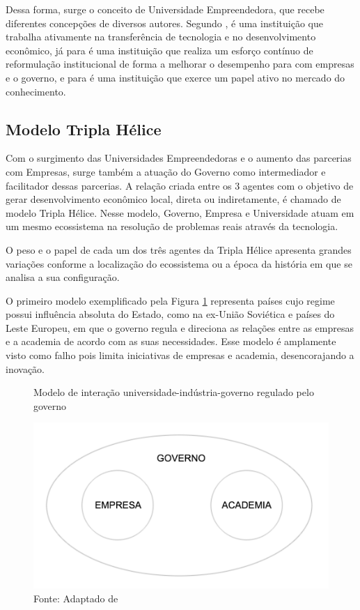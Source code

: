 Dessa forma, surge o conceito de Universidade Empreendedora, que recebe diferentes concepções de diversos autores. Segundo , é uma instituição que trabalha ativamente na transferência de tecnologia e no desenvolvimento econômico, já para  é uma instituição que realiza um esforço contínuo de reformulação institucional de forma a melhorar o desempenho para com empresas e o governo, e para  é uma instituição que exerce um papel ativo no mercado do conhecimento.

\subsection{Modelo Tripla Hélice}
\label{cha:univ_empreend}

Com o surgimento das Universidades Empreendedoras e o aumento das parcerias com Empresas, surge também a atuação do Governo como intermediador e facilitador dessas parcerias. A relação criada entre os 3 agentes com o objetivo de gerar desenvolvimento econômico local, direta ou indiretamente, é chamado de modelo Tripla Hélice. Nesse modelo, Governo, Empresa e Universidade atuam em um mesmo ecossistema na resolução de problemas reais através da tecnologia.

O peso e o papel de cada um dos três agentes da Tripla Hélice apresenta grandes variações conforme a localização do ecossistema ou a época da história em que se analisa a sua configuração. \cite{etzkowitz2000}

O primeiro modelo exemplificado pela Figura \ref{fig:triplehelix1} representa países  cujo regime possui influência absoluta do Estado, como na ex-União Soviética e países do Leste Europeu, em que o governo regula e direciona as relações entre as empresas e a academia de acordo com as suas necessidades. Esse modelo é amplamente visto como falho pois limita iniciativas de empresas e academia, desencorajando a inovação.

\begin{figure}[H]
\caption{Modelo de interação universidade-indústria-governo regulado pelo governo}
\centerline{\includegraphics[scale=0.5]{img/triplehelix1}}
\label{fig:triplehelix1}
\caption* {Fonte: Adaptado de }
\end{figure}


